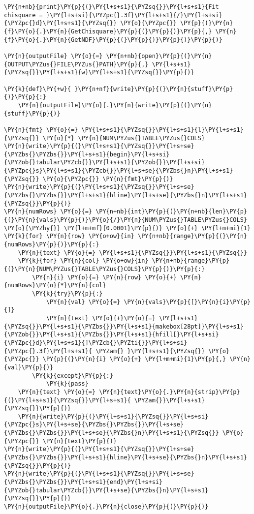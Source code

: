 \begin{Verbatim}[label=\makebox{\href{https://github.com/unipi-physics-labs/lab1-sheets/tree/main/snippy/pendolo.py}{https://github.com/.../pendolo.py}},commandchars=\\\{\}]
\PY{n+nb}{print}\PY{p}{(}\PY{l+s+s1}{\PYZsq{}}\PY{l+s+s1}{Fit chisquare = }\PY{l+s+si}{\PYZpc{}.3f}\PY{l+s+s1}{/}\PY{l+s+si}{\PYZpc{}d}\PY{l+s+s1}{\PYZsq{}} \PY{o}{\PYZpc{}} \PY{p}{(}\PY{n}{f}\PY{o}{.}\PY{n}{GetChisquare}\PY{p}{(}\PY{p}{)}\PY{p}{,} \PY{n}{f}\PY{o}{.}\PY{n}{GetNDF}\PY{p}{(}\PY{p}{)}\PY{p}{)}\PY{p}{)}

\PY{n}{outputFile} \PY{o}{=} \PY{n+nb}{open}\PY{p}{(}\PY{n}{OUTPUT\PYZus{}FILE\PYZus{}PATH}\PY{p}{,} \PY{l+s+s1}{\PYZsq{}}\PY{l+s+s1}{w}\PY{l+s+s1}{\PYZsq{}}\PY{p}{)}

\PY{k}{def}\PY{+w}{ }\PY{n+nf}{write}\PY{p}{(}\PY{n}{stuff}\PY{p}{)}\PY{p}{:}
    \PY{n}{outputFile}\PY{o}{.}\PY{n}{write}\PY{p}{(}\PY{n}{stuff}\PY{p}{)}

\PY{n}{fmt} \PY{o}{=} \PY{l+s+s1}{\PYZsq{}}\PY{l+s+s1}{l}\PY{l+s+s1}{\PYZsq{}} \PY{o}{*} \PY{n}{NUM\PYZus{}TABLE\PYZus{}COLS}
\PY{n}{write}\PY{p}{(}\PY{l+s+s1}{\PYZsq{}}\PY{l+s+se}{\PYZbs{}\PYZbs{}}\PY{l+s+s1}{begin}\PY{l+s+si}{\PYZob{}tabular\PYZcb{}}\PY{l+s+s1}{\PYZob{}}\PY{l+s+si}{\PYZpc{}s}\PY{l+s+s1}{\PYZcb{}}\PY{l+s+se}{\PYZbs{}n}\PY{l+s+s1}{\PYZsq{}} \PY{o}{\PYZpc{}} \PY{n}{fmt}\PY{p}{)}
\PY{n}{write}\PY{p}{(}\PY{l+s+s1}{\PYZsq{}}\PY{l+s+se}{\PYZbs{}\PYZbs{}}\PY{l+s+s1}{hline}\PY{l+s+se}{\PYZbs{}n}\PY{l+s+s1}{\PYZsq{}}\PY{p}{)}
\PY{n}{numRows} \PY{o}{=} \PY{n+nb}{int}\PY{p}{(}\PY{n+nb}{len}\PY{p}{(}\PY{n}{vals}\PY{p}{)}\PY{o}{/}\PY{n}{NUM\PYZus{}TABLE\PYZus{}COLS} \PY{o}{\PYZhy{}} \PY{l+m+mf}{0.0001}\PY{p}{)} \PY{o}{+} \PY{l+m+mi}{1}
\PY{k}{for} \PY{n}{row} \PY{o+ow}{in} \PY{n+nb}{range}\PY{p}{(}\PY{n}{numRows}\PY{p}{)}\PY{p}{:}
    \PY{n}{text} \PY{o}{=} \PY{l+s+s1}{\PYZsq{}}\PY{l+s+s1}{\PYZsq{}}
    \PY{k}{for} \PY{n}{col} \PY{o+ow}{in} \PY{n+nb}{range}\PY{p}{(}\PY{n}{NUM\PYZus{}TABLE\PYZus{}COLS}\PY{p}{)}\PY{p}{:}
        \PY{n}{i} \PY{o}{=} \PY{n}{row} \PY{o}{+} \PY{n}{numRows}\PY{o}{*}\PY{n}{col}
        \PY{k}{try}\PY{p}{:}
            \PY{n}{val} \PY{o}{=} \PY{n}{vals}\PY{p}{[}\PY{n}{i}\PY{p}{]}
            \PY{n}{text} \PY{o}{+}\PY{o}{=} \PY{l+s+s1}{\PYZsq{}}\PY{l+s+s1}{\PYZbs{}}\PY{l+s+s1}{makebox[28pt]}\PY{l+s+s1}{\PYZob{}}\PY{l+s+s1}{\PYZbs{}}\PY{l+s+s1}{hfill[}\PY{l+s+si}{\PYZpc{}d}\PY{l+s+s1}{]\PYZcb{}\PYZti{}}\PY{l+s+si}{\PYZpc{}.3f}\PY{l+s+s1}{ \PYZam{} }\PY{l+s+s1}{\PYZsq{}} \PY{o}{\PYZpc{}} \PY{p}{(}\PY{n}{i} \PY{o}{+} \PY{l+m+mi}{1}\PY{p}{,} \PY{n}{val}\PY{p}{)}
        \PY{k}{except}\PY{p}{:}
            \PY{k}{pass}
    \PY{n}{text} \PY{o}{=} \PY{n}{text}\PY{o}{.}\PY{n}{strip}\PY{p}{(}\PY{l+s+s1}{\PYZsq{}}\PY{l+s+s1}{ \PYZam{}}\PY{l+s+s1}{\PYZsq{}}\PY{p}{)}
    \PY{n}{write}\PY{p}{(}\PY{l+s+s1}{\PYZsq{}}\PY{l+s+si}{\PYZpc{}s}\PY{l+s+se}{\PYZbs{}\PYZbs{}}\PY{l+s+se}{\PYZbs{}\PYZbs{}}\PY{l+s+se}{\PYZbs{}n}\PY{l+s+s1}{\PYZsq{}} \PY{o}{\PYZpc{}} \PY{n}{text}\PY{p}{)}
\PY{n}{write}\PY{p}{(}\PY{l+s+s1}{\PYZsq{}}\PY{l+s+se}{\PYZbs{}\PYZbs{}}\PY{l+s+s1}{hline}\PY{l+s+se}{\PYZbs{}n}\PY{l+s+s1}{\PYZsq{}}\PY{p}{)} 
\PY{n}{write}\PY{p}{(}\PY{l+s+s1}{\PYZsq{}}\PY{l+s+se}{\PYZbs{}\PYZbs{}}\PY{l+s+s1}{end}\PY{l+s+si}{\PYZob{}tabular\PYZcb{}}\PY{l+s+se}{\PYZbs{}n}\PY{l+s+s1}{\PYZsq{}}\PY{p}{)}
\PY{n}{outputFile}\PY{o}{.}\PY{n}{close}\PY{p}{(}\PY{p}{)}
\end{Verbatim}
